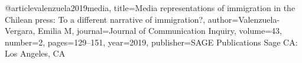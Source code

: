 


@article{valenzuela2019media,
	title={Media representations of immigration in the Chilean press: To a different narrative of immigration?},
	author={Valenzuela-Vergara, Emilia M},
	journal={Journal of Communication Inquiry},
	volume={43},
	number={2},
	pages={129--151},
	year={2019},
	publisher={SAGE Publications Sage CA: Los Angeles, CA}
}